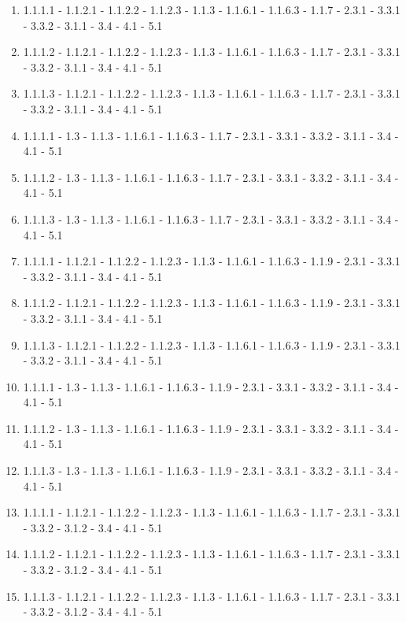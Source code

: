 \documentclass{report}
\begin{document}
            \clearpage\begin{enumerate}
                \item 1.1.1.1 - 1.1.2.1 - 1.1.2.2 - 1.1.2.3 - 1.1.3 - 1.1.6.1 - 1.1.6.3 - 1.1.7 - 2.3.1 - 3.3.1 - 3.3.2 - 3.1.1 - 3.4 - 4.1 - 5.1
                \item 1.1.1.2 - 1.1.2.1 - 1.1.2.2 - 1.1.2.3 - 1.1.3 - 1.1.6.1 - 1.1.6.3 - 1.1.7 - 2.3.1 - 3.3.1 - 3.3.2 - 3.1.1 - 3.4 - 4.1 - 5.1
                \item 1.1.1.3 - 1.1.2.1 - 1.1.2.2 - 1.1.2.3 - 1.1.3 - 1.1.6.1 - 1.1.6.3 - 1.1.7 - 2.3.1 - 3.3.1 - 3.3.2 - 3.1.1 - 3.4 - 4.1 - 5.1
                \item 1.1.1.1 - 1.3 - 1.1.3 - 1.1.6.1 - 1.1.6.3 - 1.1.7 - 2.3.1 - 3.3.1 - 3.3.2 - 3.1.1 - 3.4 - 4.1 - 5.1
                \item 1.1.1.2 - 1.3 - 1.1.3 - 1.1.6.1 - 1.1.6.3 - 1.1.7 - 2.3.1 - 3.3.1 - 3.3.2 - 3.1.1 - 3.4 - 4.1 - 5.1
                \item 1.1.1.3 - 1.3 - 1.1.3 - 1.1.6.1 - 1.1.6.3 - 1.1.7 - 2.3.1 - 3.3.1 - 3.3.2 - 3.1.1 - 3.4 - 4.1 - 5.1
                \item 1.1.1.1 - 1.1.2.1 - 1.1.2.2 - 1.1.2.3 - 1.1.3 - 1.1.6.1 - 1.1.6.3 - 1.1.9 - 2.3.1 - 3.3.1 - 3.3.2 - 3.1.1 - 3.4 - 4.1 - 5.1
                \item 1.1.1.2 - 1.1.2.1 - 1.1.2.2 - 1.1.2.3 - 1.1.3 - 1.1.6.1 - 1.1.6.3 - 1.1.9 - 2.3.1 - 3.3.1 - 3.3.2 - 3.1.1 - 3.4 - 4.1 - 5.1
                \item 1.1.1.3 - 1.1.2.1 - 1.1.2.2 - 1.1.2.3 - 1.1.3 - 1.1.6.1 - 1.1.6.3 - 1.1.9 - 2.3.1 - 3.3.1 - 3.3.2 - 3.1.1 - 3.4 - 4.1 - 5.1
                \item 1.1.1.1 - 1.3 - 1.1.3 - 1.1.6.1 - 1.1.6.3 - 1.1.9 - 2.3.1 - 3.3.1 - 3.3.2 - 3.1.1 - 3.4 - 4.1 - 5.1
                \item 1.1.1.2 - 1.3 - 1.1.3 - 1.1.6.1 - 1.1.6.3 - 1.1.9 - 2.3.1 - 3.3.1 - 3.3.2 - 3.1.1 - 3.4 - 4.1 - 5.1
                \item 1.1.1.3 - 1.3 - 1.1.3 - 1.1.6.1 - 1.1.6.3 - 1.1.9 - 2.3.1 - 3.3.1 - 3.3.2 - 3.1.1 - 3.4 - 4.1 - 5.1
                \item 1.1.1.1 - 1.1.2.1 - 1.1.2.2 - 1.1.2.3 - 1.1.3 - 1.1.6.1 - 1.1.6.3 - 1.1.7 - 2.3.1 - 3.3.1 - 3.3.2 - 3.1.2 - 3.4 - 4.1 - 5.1
                \item 1.1.1.2 - 1.1.2.1 - 1.1.2.2 - 1.1.2.3 - 1.1.3 - 1.1.6.1 - 1.1.6.3 - 1.1.7 - 2.3.1 - 3.3.1 - 3.3.2 - 3.1.2 - 3.4 - 4.1 - 5.1
                \item 1.1.1.3 - 1.1.2.1 - 1.1.2.2 - 1.1.2.3 - 1.1.3 - 1.1.6.1 - 1.1.6.3 - 1.1.7 - 2.3.1 - 3.3.1 - 3.3.2 - 3.1.2 - 3.4 - 4.1 - 5.1

\end{enumerate}
\end{document}
